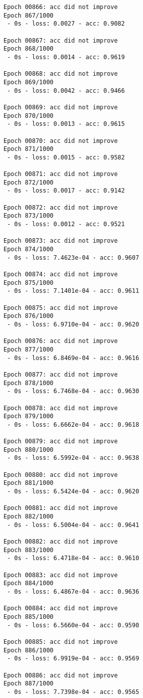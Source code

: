 \documentclass[11pt]{article}
\begin{document}
\begin{Verbatim}[commandchars=\\\{\}]
Epoch 00866: acc did not improve
Epoch 867/1000
 - 0s - loss: 0.0027 - acc: 0.9082

Epoch 00867: acc did not improve
Epoch 868/1000
 - 0s - loss: 0.0014 - acc: 0.9619

Epoch 00868: acc did not improve
Epoch 869/1000
 - 0s - loss: 0.0042 - acc: 0.9466

Epoch 00869: acc did not improve
Epoch 870/1000
 - 0s - loss: 0.0013 - acc: 0.9615

Epoch 00870: acc did not improve
Epoch 871/1000
 - 0s - loss: 0.0015 - acc: 0.9582

Epoch 00871: acc did not improve
Epoch 872/1000
 - 0s - loss: 0.0017 - acc: 0.9142

Epoch 00872: acc did not improve
Epoch 873/1000
 - 0s - loss: 0.0012 - acc: 0.9521

Epoch 00873: acc did not improve
Epoch 874/1000
 - 0s - loss: 7.4623e-04 - acc: 0.9607

Epoch 00874: acc did not improve
Epoch 875/1000
 - 0s - loss: 7.1401e-04 - acc: 0.9611

Epoch 00875: acc did not improve
Epoch 876/1000
 - 0s - loss: 6.9710e-04 - acc: 0.9620

Epoch 00876: acc did not improve
Epoch 877/1000
 - 0s - loss: 6.8469e-04 - acc: 0.9616

Epoch 00877: acc did not improve
Epoch 878/1000
 - 0s - loss: 6.7468e-04 - acc: 0.9630

Epoch 00878: acc did not improve
Epoch 879/1000
 - 0s - loss: 6.6662e-04 - acc: 0.9618

Epoch 00879: acc did not improve
Epoch 880/1000
 - 0s - loss: 6.5992e-04 - acc: 0.9638

Epoch 00880: acc did not improve
Epoch 881/1000
 - 0s - loss: 6.5424e-04 - acc: 0.9620

Epoch 00881: acc did not improve
Epoch 882/1000
 - 0s - loss: 6.5004e-04 - acc: 0.9641

Epoch 00882: acc did not improve
Epoch 883/1000
 - 0s - loss: 6.4718e-04 - acc: 0.9610

Epoch 00883: acc did not improve
Epoch 884/1000
 - 0s - loss: 6.4867e-04 - acc: 0.9636

Epoch 00884: acc did not improve
Epoch 885/1000
 - 0s - loss: 6.5660e-04 - acc: 0.9590

Epoch 00885: acc did not improve
Epoch 886/1000
 - 0s - loss: 6.9919e-04 - acc: 0.9569

Epoch 00886: acc did not improve
Epoch 887/1000
 - 0s - loss: 7.7398e-04 - acc: 0.9565


\end{Verbatim}
\end{document}
